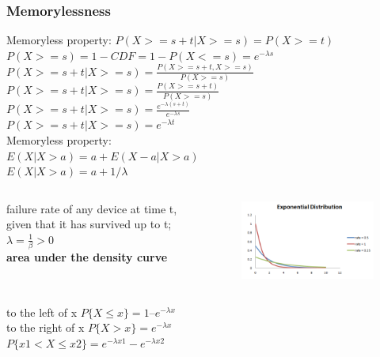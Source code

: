 \documentclass{beamer}
\begin{document}
\begin{frame}\frametitle{Memorylessness}
		Memoryless property: $P(X>=s+t | X>=s) = P(X>=t) $ \\
	$P(X>=s) = 1-CDF = 1-P(X<=s) = e^{-\lambda s}$ \\
	$P(X>=s+t | X>=s) = \frac{P(X>=s+t, X>=s)}{P(X>=s)}$ \\
	$P(X>=s+t | X>=s) = \frac{P(X>=s+t)}{P(X>=s)}$ \\
	$P(X>=s+t | X>=s) = \frac{e^{-\lambda (s+t)}}{ e^{-\lambda s}}$ \\
	$P(X>=s+t | X>=s) = e^{-\lambda t}$ \\
	Memoryless property: \\
	$E(X|X>a) = a+E(X-a|X>a)$ \\
	$E(X|X>a) = a+ 1/\lambda$ \\
	
\end{frame}


\begin{frame}%
	\begin{columns}
		\begin{column}{0.45\textwidth}
			failure rate of any device at time t, given that it has survived up to t; $\lambda = \frac{1}{\beta} > 0 $
			\\ 
			\textbf{area under the density curve}
		\end{column}
		\begin{column}{0.5\textwidth}
			\begin{figure}
				\includegraphics[scale=0.5]{exponential}
			\end{figure}
		\end{column}
	\end{columns}
			to the left of x
			 $P\{X \leq x\} = 1 – e^{-\lambda x}$
			\\ to the right of x $P\{X > x\} = e^{-\lambda x}$
			\\
			$P\{x1 < X \leq x2\} = e^{-\lambda x1} - e^{-\lambda x2}$

\end{frame}
\end{document}
